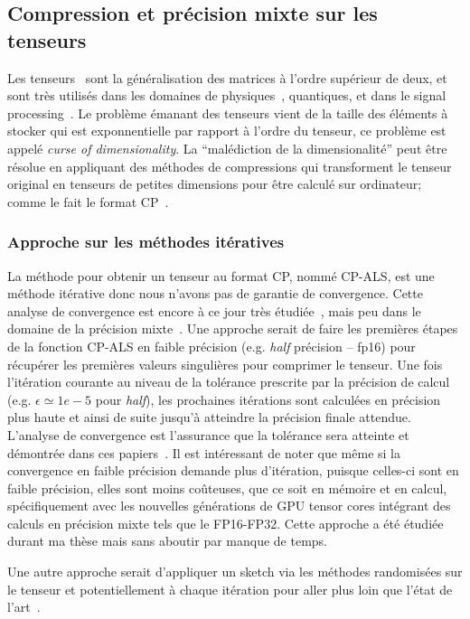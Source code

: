 \subsection{Compression et précision mixte sur les tenseurs}

Les tenseurs~\cite{koba09} sont la généralisation des matrices à l'ordre
supérieur de deux, et sont très utilisés dans les domaines de
physiques~\cite{apda81, vate07}, quantiques, et dans le signal
processing~\cite{sdfh17, co14}. Le problème émanant des tenseurs vient de la
taille des éléments à stocker qui est exponnentielle par rapport à l'ordre du
tenseur, ce problème est appelé \textit{curse of dimensionality}. La
``malédiction de la dimensionalité'' peut être résolue en appliquant des
méthodes de compressions qui transforment le tenseur original en tenseurs de
petites dimensions pour être calculé sur ordinateur; comme le fait le format
CP~\cite{koba09}.

\subsubsection*{Approche sur les méthodes itératives}

La méthode pour obtenir un tenseur au format CP, nommé CP-ALS, est une méthode
itérative donc nous n'avons pas de garantie de convergence. Cette analyse de
convergence est encore à ce jour très étudiée~\cite{ylc25}, mais peu dans le
domaine de la précision mixte~\cite{yashzh22}. Une approche serait de faire les
premières étapes de la fonction CP-ALS en faible précision (e.g. \textit{half}
précision -- fp16) pour récupérer les premières valeurs singulières pour
comprimer le tenseur. Une fois l'itération courante au niveau de la tolérance
prescrite par la précision de calcul (e.g. $\epsilon \simeq 1e-5$ pour
\textit{half}), les prochaines itérations sont calculées en précision plus
haute et ainsi de suite jusqu'à atteindre la précision finale attendue.
L'analyse de convergence est l'assurance que la tolérance sera atteinte et
démontrée dans ces papiers~\cite{golub65,blmv25}. Il est intéressant de noter
que même si la convergence en faible précision demande plus d'itération,
puisque celles-ci sont en faible précision, elles sont moins coûteuses, que ce
soit en mémoire et en calcul, spécifiquement avec les nouvelles générations de
GPU tensor cores intégrant des calculs en précision mixte tels que le
FP16-FP32. Cette approche a été étudiée durant ma thèse mais sans aboutir par
manque de temps.

Une autre approche serait d'appliquer un sketch via les méthodes randomisées
sur le tenseur et potentiellement à chaque itération pour aller plus loin que
l'état de l'art~\cite{bbk18}.

